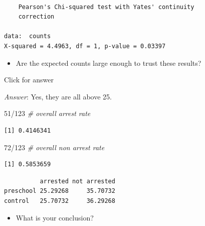 \documentclass[
]{book}
\newenvironment{Shaded}{\begin{snugshade}}{\end{snugshade}}
\newcommand{\CommentTok}[1]{\textcolor[rgb]{0.56,0.35,0.01}{\textit{#1}}}
\newcommand{\DecValTok}[1]{\textcolor[rgb]{0.00,0.00,0.81}{#1}}
\newcommand{\NormalTok}[1]{#1}
\newcommand{\SpecialCharTok}[1]{\textcolor[rgb]{0.00,0.00,0.00}{#1}}
\providecommand{\tightlist}{%
  \setlength{\itemsep}{0pt}\setlength{\parskip}{0pt}}
\begin{document}
\begin{verbatim}

    Pearson's Chi-squared test with Yates' continuity
    correction

data:  counts
X-squared = 4.4963, df = 1, p-value = 0.03397
\end{verbatim}

\begin{itemize}
\tightlist
\item
  Are the expected counts large enough to trust these results?
\end{itemize}

Click for answer

\emph{Answer}: Yes, they are all above 25.

\begin{Shaded}
\begin{Highlighting}[]
\DecValTok{51}\SpecialCharTok{/}\DecValTok{123}  \CommentTok{\# overall arrest rate}
\end{Highlighting}
\end{Shaded}

\begin{verbatim}
[1] 0.4146341
\end{verbatim}

\begin{Shaded}
\begin{Highlighting}[]
\DecValTok{72}\SpecialCharTok{/}\DecValTok{123}  \CommentTok{\# overall non arrest rate}
\end{Highlighting}
\end{Shaded}

\begin{verbatim}
[1] 0.5853659
\end{verbatim}

\begin{Shaded}
\end{Shaded}

\begin{verbatim}
          arrested not arrested
preschool 25.29268     35.70732
control   25.70732     36.29268
\end{verbatim}

\begin{itemize}
\tightlist
\item
  What is your conclusion?
\end{itemize}
\end{document}
